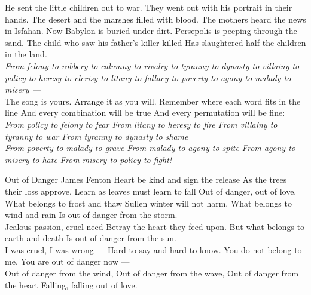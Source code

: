 \begin{poem}
 He sent the little children out to war.
 They went out with his portrait in their hands.
 The desert and the marshes filled with blood.
 The mothers heard the news in Isfahan.
 Now Babylon is buried under dirt.
 Persepolis is peeping through the sand.
 The child who saw his father's killer killed
 Has slaughtered half the children in the land.\\

\textit{
 From felony
 to robbery
 to calumny
 to rivalry
 to tyranny
 to dynasty
 to villainy
 to policy
 to heresy
 to clerisy
 to litany
 to fallacy
 to poverty
 to agony
 to malady
 to misery ---}\\

 The song is yours. Arrange it as you will.
 Remember where each word fits in the line
 And every combination will be true
 And every permutation will be fine:\\

\textit{
  From policy to felony to fear
  From litany to heresy to fire
  From villainy to tyranny to war
  From tyranny to dynasty to shame}\\

\textit{
  From poverty to malady to grave
  From malady to agony to spite
  From agony to misery to hate
  From misery to policy to fight!}\\
 \end{poem}

 \begin{poem}
{Out of Danger}
{James Fenton}
 Heart be kind and sign the release
 As the trees their loss approve.
 Learn as leaves must learn to fall
 Out of danger, out of love.\\
   
 What belongs to frost and thaw
 Sullen winter will not harm.
 What belongs to wind and rain
 Is out of danger from the storm.\\
   
 Jealous passion, cruel need
 Betray the heart they feed upon.
 But what belongs to earth and death
 Is out of danger from the sun.\\
   
 I was cruel, I was wrong ---
 Hard to say and hard to know.
 You do not belong to me.
 You are out of danger now ---\\
   
 Out of danger from the wind,
 Out of danger from the wave,
 Out of danger from the heart
 Falling, falling out of love.\\
 
\end{poem}

